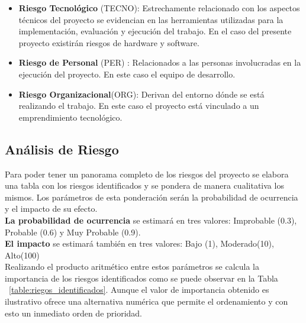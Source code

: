 \begin{itemize}
	\item \textbf{Riesgo Tecnológico} (TECNO): Estrechamente relacionado con los aspectos técnicos del proyecto se evidencian en las herramientas utilizadas para la implementación, evaluación y ejecución del trabajo. En el caso del presente proyecto existirán riesgos de hardware y software.
	\item \textbf{Riesgo de Personal} (PER) : Relacionados a las personas involucradas en la ejecución del proyecto. En este caso el equipo de desarrollo.
	\item \textbf{Riesgo Organizacional}(ORG): Derivan del entorno dónde se está realizando el trabajo. En este caso el proyecto está vinculado a un emprendimiento tecnológico.
\end{itemize}

\subsection{Análisis de Riesgo}
Para poder tener un panorama completo de los riesgos del proyecto se elabora una tabla con los riesgos identificados y se pondera de manera cualitativa los mismos. Los parámetros de esta ponderación serán la probabilidad de ocurrencia y el impacto de su efecto.\\
\textbf{La probabilidad de ocurrencia} se estimará en tres valores: Improbable (0.3), Probable (0.6) y Muy Probable (0.9).\\
\textbf{El impacto} se estimará también en tres valores: Bajo (1), Moderado(10), Alto(100)\\
Realizando el producto aritmético entre estos parámetros se calcula la importancia de los riesgos identificados como se puede observar en la Tabla ~\ref{table:riegos_identificados}.
Aunque el valor de importancia obtenido es ilustrativo ofrece una alternativa numérica que permite el ordenamiento y con esto un inmediato orden de prioridad.

